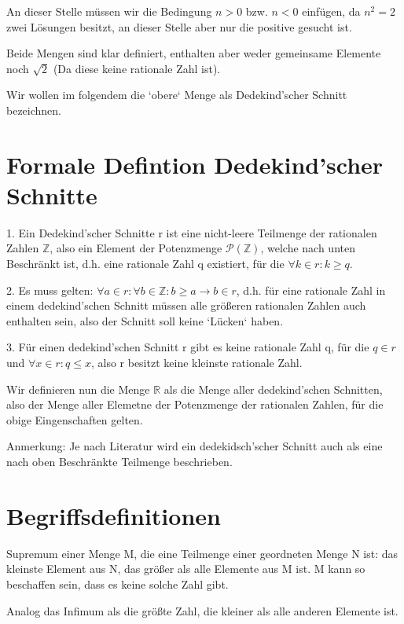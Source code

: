 \documentclass[12pt]{article}
\begin{document}
    An dieser Stelle müssen wir die Bedingung $n > 0$ bzw. $n < 0$ einfügen, da $n^2=2$ zwei Lösungen besitzt,
    an dieser Stelle aber nur die positive gesucht ist.

    Beide Mengen sind klar definiert, enthalten aber weder gemeinsame Elemente noch $\sqrt{2}$
    (Da diese keine rationale Zahl ist).

    Wir wollen im folgendem die `obere` Menge als Dedekind'scher Schnitt bezeichnen.

    \section{Formale Defintion Dedekind'scher Schnitte}

    1. Ein Dedekind'scher Schnitte r ist eine nicht-leere Teilmenge der rationalen Zahlen $\mathbb{Z}$,
    also ein Element der Potenzmenge $\mathcal{P}(\mathbb{Z})$, welche nach unten Beschränkt ist,
    d.h. eine rationale Zahl q existiert, für die $\forall k \in r: k \ge q$.

    2. Es muss gelten: $\forall a \in r: \forall b \in \mathbb{Z}: b \ge a \rightarrow b \in r$, d.h.
    für eine rationale Zahl in einem dedekind'schen Schnitt müssen alle größeren rationalen Zahlen auch enthalten sein,
    also der Schnitt soll keine `Lücken` haben.

    3. Für einen dedekind'schen Schnitt r gibt es keine rationale Zahl q, für die $q \in r$ und $\forall x \in r: q \le x$,
    also r besitzt keine kleinste rationale Zahl.

    Wir definieren nun die Menge $\mathbb{R}$ als die Menge aller dedekind'schen Schnitten, also der Menge aller
    Elemetne der Potenzmenge der rationalen Zahlen, für die obige Eingenschaften gelten.

    Anmerkung:
    Je nach Literatur wird ein dedekidsch'scher Schnitt auch als eine nach oben Beschränkte Teilmenge beschrieben.

    \section{Begriffsdefinitionen}

    Supremum einer Menge M, die eine Teilmenge einer geordneten Menge N ist: das kleinste Element aus N, das größer als
    alle Elemente aus M ist.
    M kann so beschaffen sein, dass es keine solche Zahl gibt.

    Analog das Infimum als die größte Zahl, die kleiner als alle anderen Elemente ist.
\end{document}
